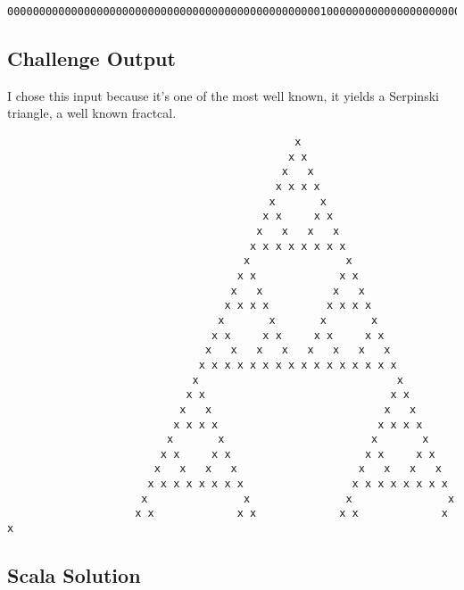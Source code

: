 \begin{lstlisting}
00000000000000000000000000000000000000000000000001000000000000000000000000000000000000000000000000
\end{lstlisting}

\subsection*{Challenge Output}\label{challenge-output-2}

I chose this input because it's one of the most well known, it yields a
Serpinski triangle, a well known fractcal.

\begin{lstlisting}
                                             x
                                            x x
                                           x   x
                                          x x x x
                                         x       x
                                        x x     x x
                                       x   x   x   x
                                      x x x x x x x x
                                     x               x
                                    x x             x x
                                   x   x           x   x
                                  x x x x         x x x x
                                 x       x       x       x
                                x x     x x     x x     x x
                               x   x   x   x   x   x   x   x
                              x x x x x x x x x x x x x x x x
                             x                               x
                            x x                             x x
                           x   x                           x   x
                          x x x x                         x x x x
                         x       x                       x       x
                        x x     x x                     x x     x x
                       x   x   x   x                   x   x   x   x
                      x x x x x x x x                 x x x x x x x x
                     x               x               x               x
                    x x             x x             x x             x x
\end{lstlisting}

\subsection*{Scala Solution}\label{scala-solution-3}

